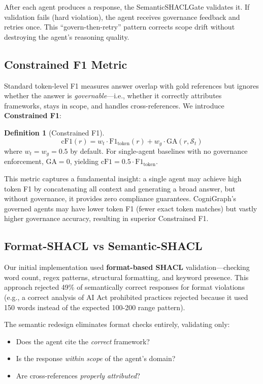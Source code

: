 \documentclass[a4paper,11pt]{article}
\theoremstyle{definition}
\newtheorem{definition}{Definition}[section]
\begin{document}
After each agent produces a response, the SemanticSHACLGate validates it. If validation fails (hard violation), the agent receives governance feedback and retries once. This ``govern-then-retry'' pattern corrects scope drift without destroying the agent's reasoning quality.

\subsection{Constrained F1 Metric}
\label{sec:constrained_f1}

Standard token-level F1 measures answer overlap with gold references but ignores whether the answer is \textit{governable}---i.e., whether it correctly attributes frameworks, stays in scope, and handles cross-references. We introduce \textbf{Constrained F1}:

\begin{definition}[Constrained F1]
\[
\mathrm{cF1}(r) = w_t \cdot \mathrm{F1}_{\mathrm{token}}(r) + w_g \cdot \mathrm{GA}(r, \mathcal{S}_t)
\]
where $w_t = w_g = 0.5$ by default. For single-agent baselines with no governance enforcement, $\mathrm{GA} = 0$, yielding $\mathrm{cF1} = 0.5 \cdot \mathrm{F1}_{\mathrm{token}}$.
\end{definition}

This metric captures a fundamental insight: a single agent may achieve high token F1 by concatenating all context and generating a broad answer, but without governance, it provides zero compliance guarantees. CogniGraph's governed agents may have lower token F1 (fewer exact token matches) but vastly higher governance accuracy, resulting in superior Constrained F1.

\subsection{Format-SHACL vs Semantic-SHACL}

Our initial implementation used \textbf{format-based SHACL} validation---checking word count, regex patterns, structural formatting, and keyword presence. This approach rejected 49\% of semantically correct responses for format violations (e.g., a correct analysis of AI Act prohibited practices rejected because it used 150 words instead of the expected 100-200 range pattern).

The semantic redesign eliminates format checks entirely, validating only:
\begin{itemize}
\item Does the agent cite the \textit{correct} framework?
\item Is the response \textit{within scope} of the agent's domain?
\item Are cross-references \textit{properly attributed}?
\end{itemize}
\end{document}
